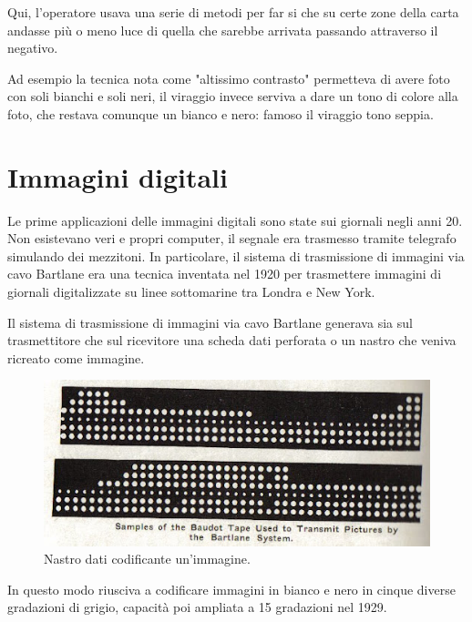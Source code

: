 \vspace{1em}\noindent 
Qui, %
l'operatore usava una serie di metodi per far si che su certe zone della carta andasse più o meno luce di quella che sarebbe arrivata passando attraverso il negativo.

Ad esempio la tecnica nota come "altissimo contrasto" permetteva di avere foto con soli bianchi e soli neri, il viraggio invece serviva a dare un tono di colore alla foto, che restava comunque un bianco e nero: famoso il viraggio tono seppia.

\section{Immagini digitali}
Le prime applicazioni delle immagini digitali sono state sui giornali negli anni 20. Non esistevano veri e propri computer, il segnale era trasmesso tramite telegrafo simulando dei mezzitoni.
In particolare, il sistema di trasmissione di immagini via cavo Bartlane era una tecnica inventata nel 1920 per trasmettere immagini di giornali digitalizzate su linee sottomarine tra Londra e New York.




\noindent Il sistema di trasmissione di immagini via cavo Bartlane generava sia sul trasmettitore che sul ricevitore una scheda dati perforata o un nastro che veniva ricreato come immagine.

\begin{figure}[htb] \centering
\includegraphics[scale=0.7, trim = 0 1.1cm 0 0, clip]{Pictures/nastro Bartlane.jpg}
\caption{Nastro dati codificante un'immagine.}\label{fig:figura}
\end{figure}

\noindent
In questo modo riusciva a codificare immagini in bianco e nero in cinque diverse gradazioni di grigio, capacità poi ampliata a 15 gradazioni nel 1929.

